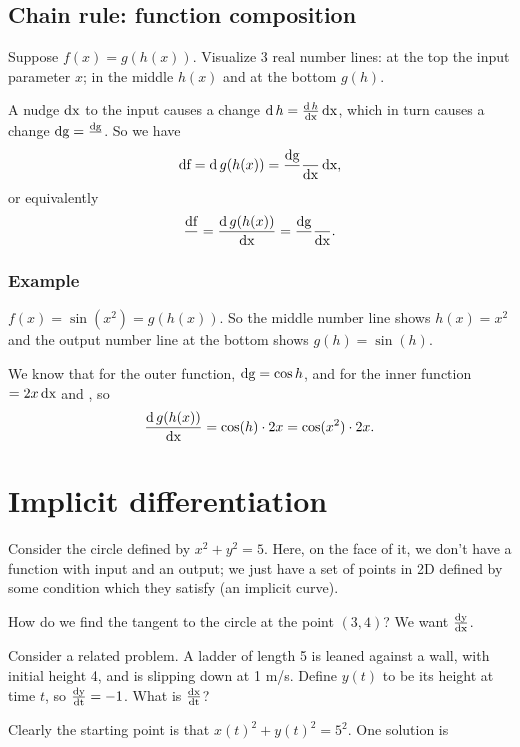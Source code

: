 \documentclass[12pt]{article}
\DeclareMathOperator{\df}{\text{df}}
\DeclareMathOperator{\dg}{\text{dg}}
\let\dh\relax\DeclareMathOperator{\dh}{\text{dh}}
\begin{document}
\subsection{Chain rule: function composition}
Suppose $f(x) = g(h(x))$. Visualize 3 real number lines: at the top the input
parameter $x$; in the middle $h(x)$ and at the bottom $g(h)$.

A nudge $\operatorname{\text{dx}}$ to the input causes a change $\operatorname{\text{d}} h = \frac{\operatorname{\text{d}} h}{\operatorname{\text{dx}}} \operatorname{\text{dx}}$, which in turn causes a
change $\dg = \frac{\dg}{\dh} \dh$. So we have
\begin{align*}
  \df = \d g(h(x)) = \frac{\dg}{\dh} \frac{\dh}{\dx} \dx,
\end{align*}
or equivalently
\begin{align*}
  \frac{\df}{\dh} = \frac{\d g(h(x))}{\dx} = \frac{\dg}{\dh} \frac{\dh}{\dx}.
\end{align*}

\subsubsection{Example}
$f(x) = \sin(x^2) = g(h(x))$. So the middle number line shows $h(x) = x^2$ and
the output number line at the bottom shows $g(h) = \sin(h)$.

We know that for the outer function, $\dg = \cos h \dh$, and for the inner
function $\dh = 2x \dx$ and , so
\begin{align*}
  \frac{\operatorname{\text{d}} g(h(x))}{\operatorname{\text{dx}}} = \cos (h) \cdot 2x = \cos(x^2)\cdot 2x.
\end{align*}

\newpage
\section{Implicit differentiation}

Consider the circle defined by $x^2 + y^2 = 5$. Here, on the face of it, we
don't have a function with input and an output; we just have a set of points in
2D defined by some condition which they satisfy (an implicit curve).

How do we find the tangent to the circle at the point $(3,4)$? We want $\frac{\operatorname{\text{dy}}}{\operatorname{\text{dx}}}$.

Consider a related problem. A ladder of length 5 is leaned against a wall, with
initial height 4, and is slipping down at 1 m/s. Define $y(t)$ to be its height
at time $t$, so $\frac{\operatorname{\text{dy}}}{\operatorname{\text{dt}}} = -1$. What is $\frac{\operatorname{\text{dx}}}{\operatorname{\text{dt}}}$?

Clearly the starting point is that $x(t)^2 + y(t)^2 = 5^2$. One solution is\\
\end{document}
